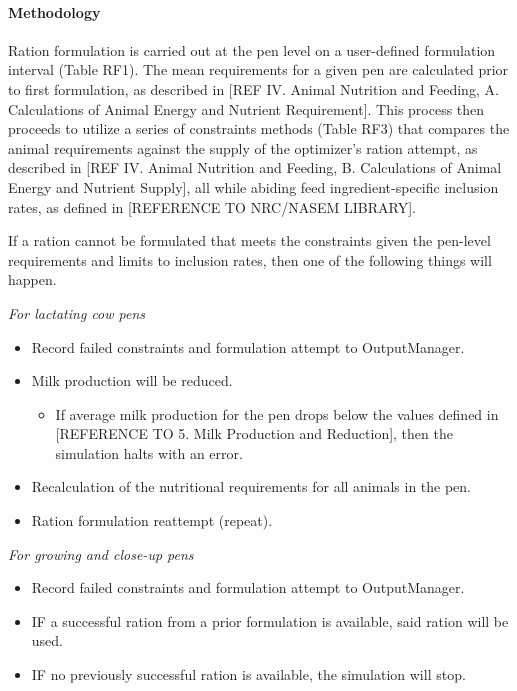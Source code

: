\documentclass{article}
\begin{document}
\begin{refsection}
\paragraph{Methodology}

 Ration formulation is carried out at the pen level on a user-defined formulation interval (Table RF1). The mean requirements for a given pen are calculated prior to first formulation, as described in [REF IV. Animal Nutrition and Feeding, A. Calculations of Animal Energy and Nutrient Requirement]. This process then proceeds to utilize a series of constraints methods (Table RF3) that compares the animal requirements against the supply of the optimizer’s ration attempt, as described in [REF IV. Animal Nutrition and Feeding, B. Calculations of Animal Energy and Nutrient Supply], all while abiding feed ingredient-specific inclusion rates, as defined in [REFERENCE TO NRC/NASEM LIBRARY]. 

If a ration cannot be formulated that meets the constraints given the pen-level requirements and limits to inclusion rates, then one of the following things will happen.
\vspace{0.2cm}

\textit{For lactating cow pens}
\begin{itemize}
    \item Record failed constraints and formulation attempt to OutputManager.
    \item Milk production will be reduced.
    \begin{itemize}
        \item If average milk production for the pen drops below the values defined in [REFERENCE TO 5. Milk Production and Reduction], then the simulation halts with an error.
    \end{itemize}
    \item Recalculation of the nutritional requirements for all animals in the pen.
    \item Ration formulation reattempt (repeat).
\end{itemize}

\textit{For growing and close-up pens}
\begin{itemize}
    \item Record failed constraints and formulation attempt to OutputManager.
    \item IF a successful ration from a prior formulation is available, said ration will be used.
    \item IF no previously successful ration is available, the simulation will stop.


\end{itemize}
\end{refsection}
\end{document}

